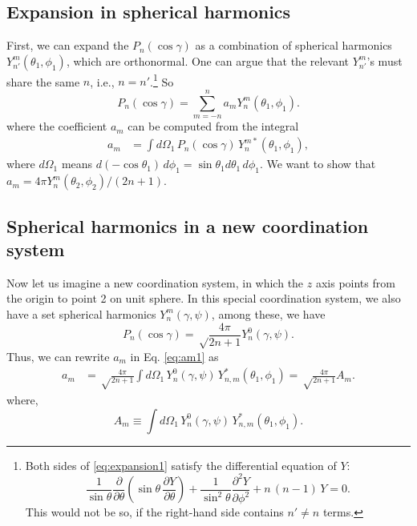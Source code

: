 \documentclass[11pt]{article}
\begin{document}
\subsection{Expansion in spherical harmonics}



First, we can expand the $P_n(\cos\gamma)$
as a combination of spherical harmonics $Y_{n'}^m(\theta_1, \phi_1)$,
which are orthonormal.
%
One can argue that the relevant $Y_{n'}^m$'s must share the same $n$,
i.e., $n = n'$.\footnote{
  Both sides of \eqref{eq:expansion1}
  satisfy the differential equation of $Y$:
\[
  \frac{ 1 } { \sin \theta }
  \frac{ \partial } { \partial \theta }
  \left(
    \sin \theta
    \,
    \frac{ \partial Y }{ \partial \theta }
  \right)
  +
  \frac { 1 } { \sin^2 \theta }
  \frac { \partial^2 Y } { \partial \phi^2 }
  + n \, (n - 1)  \, Y = 0.
\]
This would not be so,
if the right-hand side contains $n' \ne n$ terms.
}
%
So
\begin{equation}
  P_n(\cos\gamma)
=
  \sum_{m = -n}^n a_m Y_n^m(\theta_1, \phi_1).
  \label{eq:expansion1}
\end{equation}
%
where the coefficient $a_m$ can be computed from the integral
\begin{align}
  a_m
&=
\int d\Omega_1 \, P_n(\cos\gamma) \, Y_n^{m*}(\theta_1, \phi_1),
\label{eq:am1}
\end{align}
where $d\Omega_1$ means
$d(-\cos\theta_1) \, d\phi_1 = \sin\theta_1 d\theta_1 \, d\phi_1$.
%
We want to show that
$a_m = 4 \pi Y_n^m(\theta_2, \phi_2)/ ( 2 n + 1 )$.



\subsection{Spherical harmonics in a new coordination system}



Now let us imagine a new coordination system,
in which the $z$ axis points from the origin to point 2 on unit sphere.
%
In this special coordination system,
we also have a set spherical harmonics $Y_n^m(\gamma, \psi)$,
among these, we have
\[
  P_n(\cos\gamma)
=
\sqrt \frac { 4 \pi } { 2 n + 1 }
  Y_n^0(\gamma, \psi).
\]
Thus, we can rewrite $a_m$ in Eq. \eqref{eq:am1} as
\begin{align}
a_m
&=
\sqrt \frac{4 \pi}{ 2 n + 1 }
\int d\Omega_1 \, Y_n^0(\gamma, \psi) \, Y^*_{n,m}(\theta_1, \phi_1)
=
\sqrt \frac{4 \pi}{ 2 n + 1 } A_m.
\label{eq:am2}
\end{align}
%
where,
\begin{equation}
A_m
\equiv
\int d\Omega_1 \, Y_n^0(\gamma, \psi) \, Y^*_{n,m}(\theta_1, \phi_1).
\label{eq:Am}
\end{equation}
\end{document}
